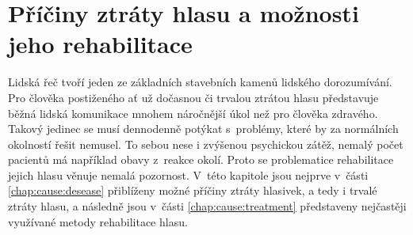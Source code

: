 \chapter{Příčiny ztráty hlasu a možnosti jeho rehabilitace}
\label{chap:cause}

Lidská řeč tvoří jeden ze základních stavebních kamenů lidského dorozumívání. Pro člověka
postiženého ať už dočasnou či trvalou ztrátou hlasu představuje běžná lidská
komunikace mnohem náročnější úkol než pro člověka zdravého. Takový jedinec se
musí dennodenně potýkat s~problémy, které by za normálních okolností řešit
nemusel. To sebou nese %
i zvýšenou psychickou zátěž, nemalý počet pacientů má například obavy %
z~reakce okolí. Proto se problematice rehabilitace jejich
hlasu věnuje nemalá pozornost. V~této kapitole jsou nejprve v~části
\ref{chap:cause:desease} přiblíženy možné příčiny ztráty hlasivek, a tedy i
trvalé ztráty hlasu, a následně jsou v~části \ref{chap:cause:treatment} představeny
nejčastěji využívané metody rehabilitace hlasu.



% 
% 
